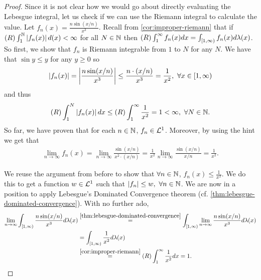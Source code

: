 \begin{proof}
	Since it is not clear how we would go about directly evaluating the Lebesgue integral, let us check if we can use the Riemann integral to calculate the value. Let $f_n(x) = \frac{n \sin (x/n)}{x^3}$. Recall from \autoref{cor:improper-riemann} that if $(R)\int_1^{\mathbb{N}} \left\vert{f_n(x)}\right\vert d(x) < \infty$ for all $N \in \mathbb{N}$ then $(R)\int_1^\infty f_n(x) dx = \int_{[1, \infty)} f_n(x) d\lambda(x)$. So first, we show that $f_n$ is Riemann integrable from $1$ to $N$ for any $N$. We have that $\sin y \leq y$ for any $y \geq 0$ so
	\begin{align*}
		\left\vert{f_n(x)}\right\vert = \left\vert{\frac{n \sin (x/n)}{x^3}}\right\vert \leq \frac{n \cdot (x/n)}{x^3} = \frac{1}{x^2},\ \forall x \in [1, \infty)
	\end{align*}
	and thus
	\begin{align*}
		(R)\int_1^N \left\vert{f_n(x)}\right\vert dx \leq (R)\int_1^\infty \frac{1}{x^2} = 1 < \infty,\ \forall N \in \mathbb{N}.
	\end{align*}
	So far, we have proven that for each $n \in \mathbb{N}$, $f_n \in \mathcal{L}^1$. Moreover, by using the hint we get that
	\begin{align*}
		\lim_{n\to\infty} f_n(x)
		= \lim_{n\to\infty} \frac{\sin(x/n)}{x^2 \cdot (x/n)}
		= \frac{1}{x^2}\lim_{n\to\infty} \frac{\sin(x/n)}{x/n}
		= \frac{1}{x^2}.
	\end{align*}
	
	We reuse the argument from before to show that $\forall n \in \mathbb{N}$, $f_n(x) \leq \frac{1}{x^2}$. We do this to get a function $w \in \mathcal{L}^1$ such that $\abs{f_n} \leq w,\ \forall n \in \N$. We are now in a position to apply Lebesgue's Dominated Convergence theorem (cf. \autoref{thm:lebesgue-dominated-convergence}). With no further ado,
	\begin{align*}
		\lim_{n\to\infty} \int_{[1, \infty)} \frac{n \sin(x/n)}{x^3}d\lambda(x)
		&\overset{\ref{thm:lebesgue-dominated-convergence}}{=} \int_{[1, \infty)} \lim_{n\to\infty} \frac{n\sin(x/n)}{x^3}d\lambda(x)\\
		&= \int_{[1,\infty)} \frac{1}{x^2}d\lambda(x)\\
		&\overset{\ref{cor:improper-riemann}}{=} (R)\int_1^\infty \frac{1}{x^2}dx = 1.
	\end{align*}
\end{proof}

